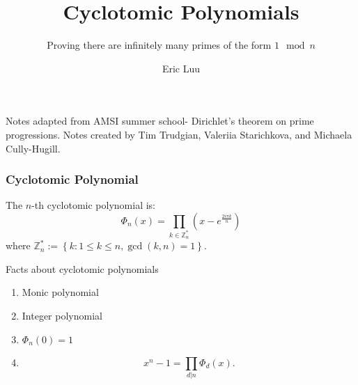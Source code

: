 \documentclass[]{beamer}
\title{Cyclotomic Polynomials}
\subtitle{Proving there are infinitely many primes of the form $1 \mod n$}
\author{Eric Luu}
\begin{document}
\begin{frame}
	Notes adapted from AMSI summer school- Dirichlet's theorem on prime progressions. 
	Notes created by Tim Trudgian, Valeriia Starichkova, and Michaela Cully-Hugill.
\end{frame}

\begin{frame}
	
\frametitle{Cyclotomic Polynomial}
The $n$-th cyclotomic polynomial is:
	\begin{equation}
		\Phi_n(x) = \prod_{k \in \mathbb{Z}_n^*}\left(x - e^{\frac{2 i \pi k}{n}}\right)
	\end{equation}
	where $\mathbb{Z}_n^* := \left\lbrace k : 1 \leq k \leq n, \gcd(k, n) = 1 \right\rbrace$. 
	\begin{block}{Facts about cyclotomic polynomials}
		\begin{enumerate}
			\item Monic polynomial
			\item Integer polynomial
			\item $\Phi_n(0) = 1$
			\item 		\begin{equation}
				x^n - 1 = \prod_{d|n} \Phi_d(x).
			\end{equation}
		\end{enumerate}
	\end{block}
\end{frame}
\end{document}
